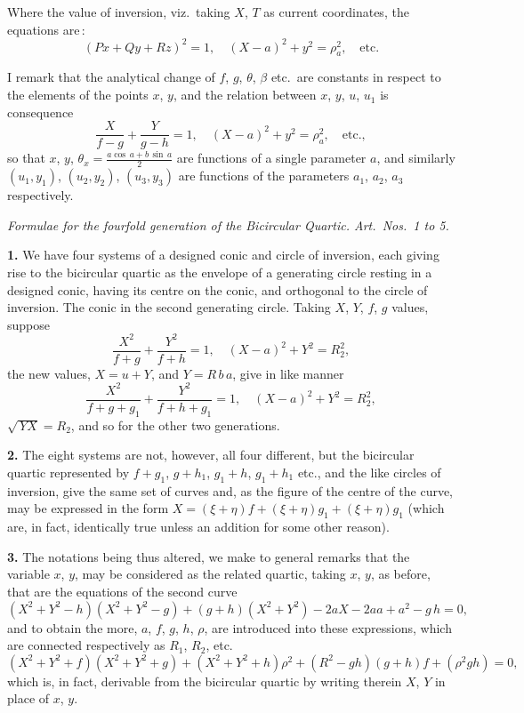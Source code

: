 \documentclass[11pt,a4paper]{article}
\theoremstyle{plain}
\theoremstyle{definition}
\begin{document}
Where the value of inversion, viz.\ taking $X$, $T$ as current coordinates, the equations are\,:
\[
(P x + Q y + R z)^2 = 1, \quad (X - a)^2 + y^2 = \rho_a^2, \quad \text{etc.}
\]

I remark that the analytical change of $f$, $g$, $\theta$, $\beta$ etc.\ are constants in respect to the elements of the points $x$, $y$, and the relation between $x$, $y$, $u$, $u_1$ is consequence
\[
\frac{X}{f - g} + \frac{Y}{g - h} = 1, \quad (X - a)^2 + y^2 = \rho_a^2, \quad \text{etc.},
\]
so that $x$, $y$, $\theta_x = \frac{a\cos\,a + b\,\sin\,a}{2}$ are functions of a single parameter $a$, and similarly $(u_1, y_1)$, $(u_2, y_2)$, $(u_3, y_3)$ are functions of the parameters $a_1$, $a_2$, $a_3$ respectively.

\medskip

\noindent\textit{Formulae for the fourfold generation of the Bicircular Quartic. Art.\ Nos.\ 1 to 5.}

\medskip

\noindent\textbf{1.} We have four systems of a designed conic and circle of inversion, each giving rise to the bicircular quartic as the envelope of a generating circle resting in a designed conic, having its centre on the conic, and orthogonal to the circle of inversion. The conic in the second generating circle. Taking $X$, $Y$, $f$, $g$ values, suppose
\[
\frac{X^2}{f + g} + \frac{Y^2}{f + h} = 1, \quad (X - a)^2 + Y^2 = R_2^2,
\]
the new values, $X = u + Y$, and $Y = R\,b\,a$, give in like manner
\[
\frac{X^2}{f + g + g_1} + \frac{Y^2}{f + h + g_1} = 1, \quad (X - a)^2 + Y^2 = R_2^2,
\]
$\sqrt{\,Y X} = R_2$, and so for the other two generations.

\medskip

\noindent\textbf{2.} The eight systems are not, however, all four different, but the bicircular quartic represented by $f + g_1$, $g + h_1$, $g_1 + h$, $g_1 + h_1$ etc., and the like circles of inversion, give the same set of curves and, as the figure of the centre of the curve, may be expressed in the form $X = (\xi + \eta) f + (\xi + \eta) g_1 + (\xi + \eta) g_1$ (which are, in fact, identically true unless an addition for some other reason).

\medskip

\noindent\textbf{3.} The notations being thus altered, we make to general remarks that the variable $x$, $y$, may be considered as the related quartic, taking $x$, $y$, as before, that are the equations of the second curve
\[
( X^2 + Y^2 - h)(X^2 + Y^2 - g) + (g + h)(X^2 + Y^2) - 2 a X - 2 a a + a^2 - g\,h = 0,
\]
and to obtain the more, $a$, $f$, $g$, $h$, $\rho$, are introduced into these expressions, which are connected respectively as $R_1$, $R_2$, etc.\
\[
( X^2 + Y^2 + f)(X^2 + Y^2 + g) + (X^2 + Y^2 + h)\rho^2 + (R^2 - g h)(g + h) f + (\rho^2 g h) = 0,
\]
which is, in fact, derivable from the bicircular quartic by writing therein $X$, $Y$ in place of $x$, $y$.
\end{document}

